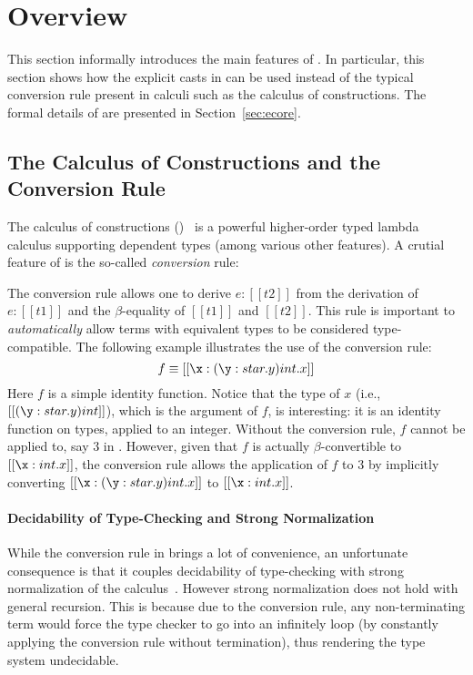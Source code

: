 \HaskellReset

\makeatother
\EndFmtInput

\section{Overview}

This section informally introduces the main features of \name. In
particular, this section shows how the explicit casts in \name can be
used instead of the typical conversion rule present in calculi such as
the calculus of constructions. The formal details of \name are
presented in Section~\ref{sec:ecore}. 

\subsection{The Calculus of Constructions and the Conversion Rule}
\label{sec:coc}

The calculus of constructions (\coc)~\cite{coc} is a powerful
higher-order typed lambda calculus supporting dependent types (among
various other features).  A crutial
feature of \coc is the so-called \emph{conversion}
rule: \ottusedrule{\ottdruleTccXXConv{}}


The conversion rule allows one to derive $e:[[t2]]$ from the
derivation of $e:[[t1]]$ and the $\beta$-equality of $[[t1]]$ and
$[[t2]]$. This rule is important to \emph{automatically} allow terms
with equivalent types to be considered type-compatible.  The following
example illustrates the use of the conversion rule:
\[
f \equiv [[\x:(\y:star.y)int.x]]
\]
Here $f$ is a simple identity function. Notice that the type of $x$
(i.e., $[[(\y:star.y)int]]$), which is the argument of $f$, is
interesting: it is an identity function on types, applied to an
integer.  Without the conversion rule, $f$ cannot be applied to, say
$3$ in \coc. However, given that $f$ is actually $\beta$-convertible
to $[[\x:int.x]]$, the conversion rule allows the application of $f$
to $3$ by implicitly converting $[[\x:(\y:star.y)int.x]]$ to
$[[\x:int.x]]$.

\paragraph{Decidability of Type-Checking and Strong Normalization}
While the conversion rule in \coc brings a lot of convenience, an
unfortunate consequence is that it couples decidability of
type-checking with strong normalization of the
calculus~\cite{coc:decidability}.  However strong normalization does
not hold with general recursion. This is because due to the conversion
rule, any non-terminating term would force the type checker to go into
an infinitely loop (by constantly applying the conversion rule without
termination), thus rendering the type system undecidable.

